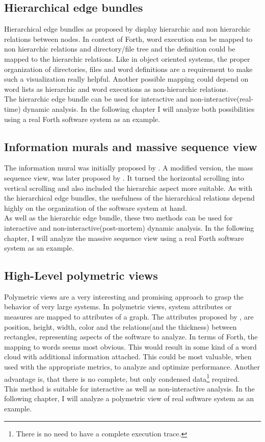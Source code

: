 \subsection*{Hierarchical edge bundles}
Hierarchical edge bundles as proposed by \cite{Holten:2006:HEB:1187627.1187772} display hierarchic and non hierarchic relations between nodes. In context of Forth, word execution can be mapped to non hierarchic relations and directory/file tree and the definition could be mapped to the hierarchic relations. Like in object oriented systems, the proper organization of directories, files and word definitions are a requirement to make such a visualization really helpful.
Another possible mapping could depend on word lists as hierarchic and word executions as non-hierarchic relations.
\\
The hierarchic edge bundle can be used for interactive and non-interactive(real-time) dynamic analysis. In the following chapter I will analyze both possibilities using a real Forth software system as an example.

\subsection*{Information murals and massive sequence view}
The information mural was initially proposed by \cite{Jerding:1998:IMT:614271.614408}. A modified version, the mass sequence view, was later proposed by \cite{Cornelissen2009}. It turned the horizontal scrolling into vertical scrolling and also included the hierarchic aspect more suitable. As with the hierarchical edge bundles, the usefulness of the hierarchical relations depend highly on the organization of the software system at hand.
\\
As well as the hierarchic edge bundle, these two methods can be used for interactive and non-interactive(post-mortem) dynamic analysis. In the following chapter, I will analyze the massive sequence view using a real Forth software system as an example.

\subsection*{High-Level polymetric views}
Polymetric views\cite{Ducasse:2004:HPV:977397.977739} are a very interesting and promising approach to grasp the behavior of very large systems. In polymetric views, system attributes or measures are mapped to attributes of a graph. The attributes proposed by \cite{Ducasse:2004:HPV:977397.977739}, are position, height, width, color and the relations(and the thickness) between rectangles, representing aspects of the software to analyze. In terms of Forth, the mapping to words seems most obvious. This would result in some kind of a word cloud with additional information attached. This could be most valuable, when used with the appropriate metrics, to analyze and optimize performance. Another advantage is, that there is no complete, but only condensed data\footnote{There is no need to have a complete execution trace.} required.
\\
This method is suitable for interactive as well as non-interactive analysis. In the following chapter, I will analyze a polymetric view of real software system as an example.

